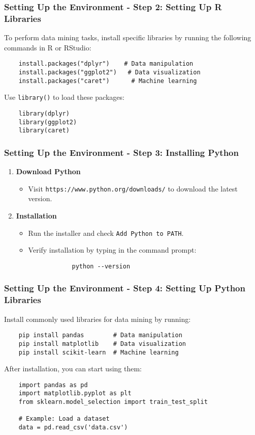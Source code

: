 \documentclass[aspectratio=169]{beamer}
\begin{document}
\begin{frame}[fragile]
    \frametitle{Setting Up the Environment - Step 2: Setting Up R Libraries}
    To perform data mining tasks, install specific libraries by running the following commands in R or RStudio:
    \begin{lstlisting}
    install.packages("dplyr")    # Data manipulation
    install.packages("ggplot2")   # Data visualization
    install.packages("caret")      # Machine learning
    \end{lstlisting}
    Use \texttt{library()} to load these packages:
    \begin{lstlisting}
    library(dplyr)
    library(ggplot2)
    library(caret)
    \end{lstlisting}
\end{frame}

\begin{frame}[fragile]
    \frametitle{Setting Up the Environment - Step 3: Installing Python}
    \begin{enumerate}
        \item \textbf{Download Python}
        \begin{itemize}
            \item Visit \texttt{https://www.python.org/downloads/} to download the latest version.
        \end{itemize}
        
        \item \textbf{Installation}
        \begin{itemize}
            \item Run the installer and check \texttt{Add Python to PATH}.
            \item Verify installation by typing in the command prompt:
            \begin{lstlisting}
            python --version
            \end{lstlisting}
        \end{itemize}
    \end{enumerate}
\end{frame}

\begin{frame}[fragile]
    \frametitle{Setting Up the Environment - Step 4: Setting Up Python Libraries}
    Install commonly used libraries for data mining by running:
    \begin{lstlisting}
    pip install pandas        # Data manipulation
    pip install matplotlib    # Data visualization
    pip install scikit-learn  # Machine learning
    \end{lstlisting}
    
    After installation, you can start using them:
    \begin{lstlisting}
    import pandas as pd
    import matplotlib.pyplot as plt
    from sklearn.model_selection import train_test_split
    
    # Example: Load a dataset
    data = pd.read_csv('data.csv')
    \end{lstlisting}
\end{frame}
\end{document}
